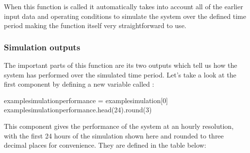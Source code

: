 \documentclass[letterpaper,10pt,english]{sphinxmanual}
\begin{document}
\sphinxAtStartPar
When this function is called it automatically takes into account all of
the earlier input data and operating conditions to simulate the system
over the defined time period \sphinxhyphen{} making the function itself very
straightforward to use.


\subsubsection{Simulation outputs}
\label{\detokenize{energy_system_simulation:simulation-outputs}}
\sphinxAtStartPar
The important parts of this function are its two outputs which tell us
how the system has performed over the simulated time period. Let’s take
a look at the first component by defining a new variable called
:

\begin{sphinxVerbatim}[commandchars=\\\{\}]
example\PYGZus{}simulation\PYGZus{}performance = example\PYGZus{}simulation[0]
example\PYGZus{}simulation\PYGZus{}performance.head(24).round(3)
\end{sphinxVerbatim}



\begin{DUlineblock}{0em}
\item[] 
\end{DUlineblock}

\sphinxAtStartPar
This component gives the performance of the system at an hourly
resolution, with the first 24 hours of the simulation shown here and
rounded to three decimal places for convenience. They are defined in the
table below:
\end{document}
